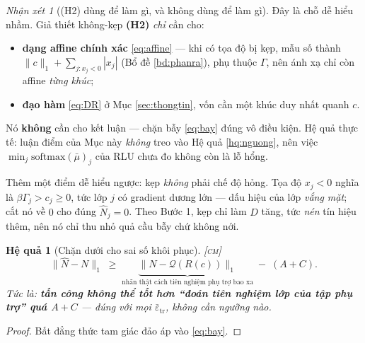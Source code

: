 \documentclass[11pt,a4paper]{article}
\newtheorem{hequa}[dinhly]{Hệ quả}
\theoremstyle{remark}
\newtheorem{nhanxet}[dinhly]{Nhận xét}
\newcommand{\quant}{\mathcal{Q}}
\newcommand{\epstr}{\bar\varepsilon_{\mathrm{tr}}}
\begin{document}
\begin{nhanxet}[(H2) dùng để làm gì, và không dùng để làm gì]
\label{nx:vaitroH2}
Đây là chỗ dễ hiểu nhầm. Giả thiết không-kẹp \textbf{(H2)} \emph{chỉ} cần cho:
\begin{itemize}
\item \textbf{dạng affine chính xác} \eqref{eq:affine} --- khi có tọa độ bị
  kẹp, mẫu số thành $\|c\|_1+\sum_{j:x_j<0}|x_j|$ (Bổ đề \ref{bd:phanra}),
  phụ thuộc $\Gamma$, nên ánh xạ chỉ còn affine \emph{từng khúc};
\item \textbf{đạo hàm} \eqref{eq:DR} ở Mục \ref{sec:thongtin}, vốn cần một
  khúc duy nhất quanh $c$.
\end{itemize}
Nó \textbf{không} cần cho kết luận --- chặn bẫy \eqref{eq:bay} đúng vô điều
kiện. Hệ quả thực tế: luận điểm của Mục này \emph{không} treo vào Hệ quả
\ref{hq:nguong}, nên việc $\min_j\mathrm{softmax}(\bar\mu)_j$ của RLU chưa đo
không còn là lỗ hổng.

Thêm một điểm dễ hiểu ngược: kẹp \emph{không} phải chế độ hỏng. Tọa độ
$x_j<0$ nghĩa là $\beta\Gamma_j>c_j\ge0$, tức lớp $j$ có gradient dương lớn
--- dấu hiệu của lớp \emph{vắng mặt}; cắt nó về $0$ cho đúng $\hat N_j=0$.
Theo Bước 1, kẹp chỉ làm $D$ tăng, tức \emph{nén} tín hiệu thêm, nên nó chỉ
thu nhỏ quả cầu bẫy chứ không nới.
\end{nhanxet}

\begin{hequa}[Chặn dưới cho sai số khôi phục]
\label{hq:chanduoi}
\textsc{[cm]}\;
\[
\|\hat N-N\|_1\;\ge\;
\underbrace{\bigl\|N-\quant(R(c))\bigr\|_1}_{\text{nhãn thật cách tiên nghiệm phụ trợ bao xa}}
\;-\;(A+C).
\]
Tức là: \textbf{tấn công không thể tốt hơn ``đoán tiên nghiệm lớp của tập phụ
trợ'' quá $A+C$} --- đúng với \emph{mọi} $\epstr$, không cần ngưỡng nào.
\end{hequa}

\begin{proof}
Bất đẳng thức tam giác đảo áp vào \eqref{eq:bay}.
\end{proof}
\end{document}
